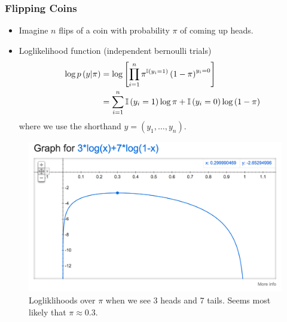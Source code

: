 \documentclass[10pt,mathserif]{beamer}
\begin{document}
\begin{frame}
  \frametitle{Flipping Coins}
  \begin{itemize}
  \item Imagine $n$ flips of a coin with probability $\pi$ of coming up heads.
  \item Loglikelihood function (independent bernoulli trials)
    \begin{align*}
      \log p\left(y \vert \pi \right) &= \log \left[\prod_{i = 1}^{n} \pi^{\mathbb{I}\left({y_i = 1}\right)}\left(1 - \pi\right)^{y_i = 0}\right] \\
      &= \sum_{i = 1}^{n} \mathbb{I}\left({y_i = 1}\right)\log \pi + \mathbb{I}\left({y_i = 0}\right)\log\left(1 - \pi\right)
    \end{align*}
    where we use the shorthand $y = \left(y_1, \dots, y_n\right)$.
  \end{itemize}
  \begin{figure}[ht]
    \centering
    \includegraphics[width=0.3\paperwidth]{figure/loglikelihood_bernoulli_10}
    \caption{Logliklihoods over $\pi$ when we see 3 heads and 7 tails. Seems
      most likely that $\pi \approx 0.3$. \label{fig:loglikelihood_bernoulli_10} }
  \end{figure}
\end{frame}
\end{document}
